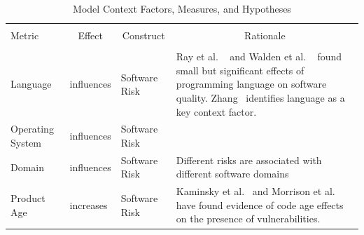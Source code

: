 \begin{table}[!htbp] \centering 
	\caption{Model Context Factors, Measures, and Hypotheses} 
	\label{tab:model_spef_metrics} 
	\begin{scriptsize}
		\begin{tabular}{p{1.75cm}p{1cm}p{1cm}p{6cm}} 
			\\[-1.8ex]\hline 
		\hline \\[-1.8ex] 
		Metric & \multicolumn{1}{c}{Effect} & \multicolumn{1}{c}{Construct} & \multicolumn{1}{c}{Rationale} \\ 
		\hline \\[-1.8ex]  
			Language	& influences &	Software Risk &   Ray et al. ~\cite{ray2014a} and Walden et al. ~\cite{walden2010idea} found small but significant effects of programming language on software quality. Zhang~\cite{zhang2014towards} identifies language as a key context factor. \\
			Operating System	& influences &	Software Risk & \\	
			Domain &	influences &	Software Risk	 & Different risks are associated with different software domains~\cite{williams2004xpef,jones2000software} \\
			Product Age	& increases &	Software Risk & Kaminsky et al.~\cite{kaminsky2011showing} and Morrison et al.~\cite{morrison2015challenges} have found evidence of code age effects on the presence of vulnerabilities. \\
			

\end{tabular}
\end{scriptsize}
\end{table}
